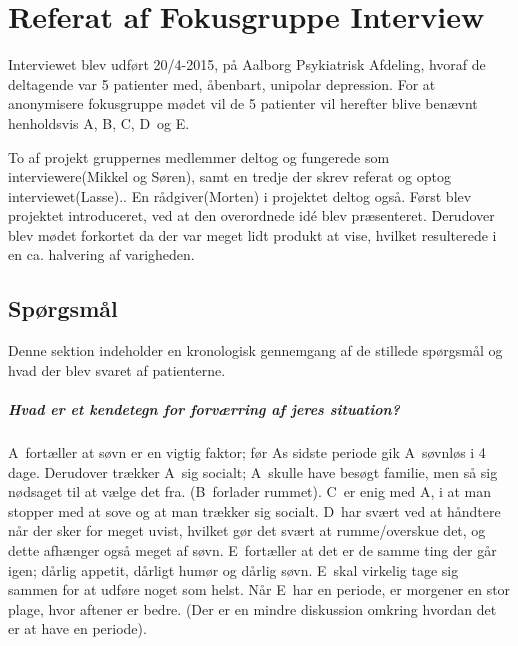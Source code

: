 \chapter{Referat af Fokusgruppe Interview}\label{app:fokusgruppe-interview-referat}
\newcommand{\pa}{A}
\newcommand{\pb}{B}
\newcommand{\pc}{C}
\newcommand{\pd}{D}
\newcommand{\pe}{E}

Interviewet blev udført 20/4-2015, på Aalborg Psykiatrisk Afdeling, hvoraf de deltagende var 5 patienter med, åbenbart, unipolar depression.
For at anonymisere fokusgruppe mødet vil de 5 patienter vil herefter blive benævnt henholdsvis \pa, \pb, \pc, \pd~og \pe.

To af projekt gruppernes medlemmer deltog og fungerede som interviewere(Mikkel og Søren), samt en tredje der skrev referat og optog interviewet(Lasse).. En rådgiver(Morten) i projektet deltog også.
Først blev projektet introduceret, ved at den overordnede idé blev præsenteret.
Derudover blev mødet forkortet da der var meget lidt produkt at vise, hvilket resulterede i en ca. halvering af varigheden.

\section{Spørgsmål}
Denne sektion indeholder en kronologisk gennemgang af de stillede spørgsmål og hvad der blev svaret af patienterne.

\paragraph{Hvad er et kendetegn for forværring af jeres situation?}
\pa~fortæller at søvn er en vigtig faktor; før \pa s sidste periode gik \pa~søvnløs i 4 dage.
Derudover trækker \pa~sig socialt; \pa~skulle have besøgt familie, men så sig nødsaget til at vælge det fra.
(\pb~forlader rummet).
\pc~er enig med \pa, i at man stopper med at sove og at man trækker sig socialt.
\pd~har svært ved at håndtere når der sker for meget uvist, hvilket gør det svært at rumme/overskue det, og dette afhænger også meget af søvn.
\pe~fortæller at det er de samme ting der går igen; dårlig appetit, dårligt humør og dårlig søvn.
\pe~skal virkelig tage sig sammen for at udføre noget som helst.
Når \pe~har en periode, er morgener en stor plage, hvor aftener er bedre.
(Der er en mindre diskussion omkring hvordan det er at have en periode).

